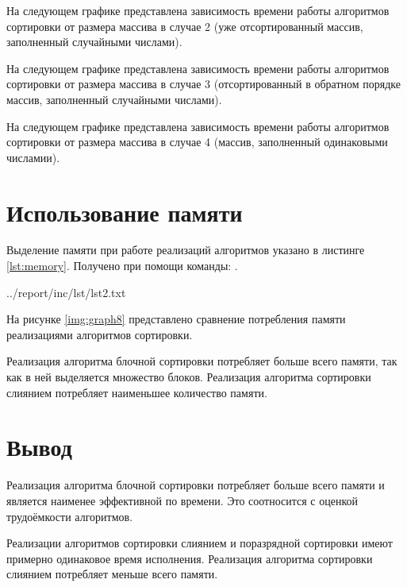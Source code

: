 \pagebreak

На следующем графике представлена зависимость времени работы алгоритмов сортировки от размера массива в случае 2 (уже отсортированный массив, заполненный случайными числами).


\pagebreak

На следующем графике представлена зависимость времени работы алгоритмов сортировки от размера массива в случае 3 (отсортированный в обратном порядке массив, заполненный случайными числами).


На следующем графике представлена зависимость времени работы алгоритмов сортировки от размера массива в случае 4 (массив, заполненный одинаковыми числамии).


\newpage

\section{Использование памяти}

Выделение памяти при работе реализаций алгоритмов указано в листинге \ref{lst:memory}. Получено при помощи команды: .

\newpage

\begin{lstinputlisting}[
	caption={Использование памяти},
	label={lst:memory},
	style={sh},
	linerange{1-14},
	]{../report/inc/lst/lst2.txt}
\end{lstinputlisting}

\newpage

На рисунке \ref{img:graph8} представлено сравнение потребления памяти реализациями алгоритмов сортировки.


Реализация алгоритма блочной сортировки потребляет больше всего памяти, так как в ней выделяется множество блоков. Реализация алгоритма сортировки слиянием потребляет наименьшее количество памяти.

\pagebreak

\section*{Вывод}

Реализация алгоритма блочной сортировки потребляет больше всего памяти и является наименее эффективной по времени. 
Это соотносится с оценкой трудоёмкости алгоритмов.

Реализации алгоритмов сортировки слиянием и поразрядной сортировки имеют примерно одинаковое время исполнения. 
Реализация алгоритма сортировки слиянием потребляет меньше всего памяти.


